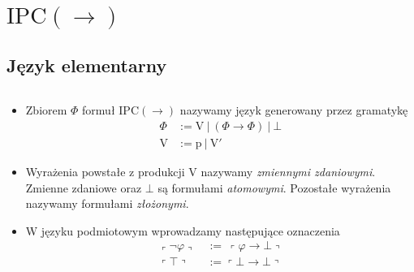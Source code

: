 \section{\(\mathrm{IPC}(\rightarrow)\)}
\subsection{Język elementarny}

\begin{definicja}$ $\newline
  \begin{itemize}
    \item  Zbiorem \(\Phi\) formuł \(\mathrm{IPC}(\rightarrow)\) nazywamy język generowany przez gramatykę 
    \begin{align*}
    \Phi &:= \mathrm{V}\ |\ \left ( \Phi \rightarrow \Phi \right )\ |\ \bot\\
    \mathrm{V} &:= \mathrm{p}\ |\ \mathrm{V'}
    \end{align*}

    \item Wyrażenia powstałe z produkcji V nazywamy \emph{zmiennymi zdaniowymi}. Zmienne zdaniowe oraz \(\bot\) są formułami \emph{atomowymi}. Pozostałe wyrażenia nazywamy formułami \emph{złożonymi}. 

    \item W języku podmiotowym wprowadzamy następujące oznaczenia
    \begin{align*}
      \left\ulcorner \lnot \varphi\right\urcorner\ &:=\ \left\ulcorner\varphi\rightarrow\bot\right\urcorner\\
      \left\ulcorner\top\right\urcorner &:= \left\ulcorner\bot\rightarrow\bot\right\urcorner
    \end{align*}

  \end{itemize}

\end{definicja}

